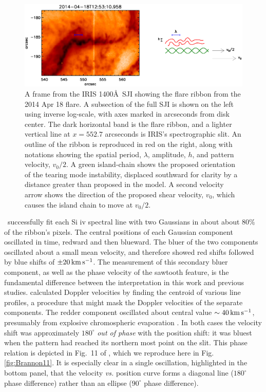 \begin{figure}[htbp]
\centerline{\includegraphics[width=6.5in]{ParkerLongcope2017/sji_context}}
\caption{A frame from the IRIS 1400\AA\ SJI showing the flare ribbon from the 2014 Apr 18 flare.  A subsection of the full SJI is shown on the left using inverse log-scale, with axes marked in arcseconds from disk center.  The dark horizontal band is the flare ribbon, and a lighter vertical line at $x=552.7$ arcseconds is IRIS's spectrographic slit.  An outline of the ribbon is reproduced  in red on the right, along with notations showing the spatial period, $\lambda$, amplitude, $h$, and pattern velocity, $v_0/2$.  A green island-chain shows the proposed orientation of the tearing mode instability, displaced southward for clarity by a distance greater than proposed in the model.  A second velocity arrow shows the direction of the proposed shear velocity, $v_0$, which causes the island chain to move at $v_0/2$.}
	\label{fig:SJI}
\end{figure}

\BLQ\ successfully fit  each Si {\sc iv} spectral line with two Gaussians in about about $80\%$ of the ribbon's pixels.  The central positions of each Gaussian component oscillated in time, redward and then blueward. The bluer of the two components oscillated about a small mean velocity, and therefore showed red shifts followed by blue shifts of 
$\pm 20\,{\rm km\, s^{-1}}$. The measurement of this secondary bluer component, as well as the phase velocity of the sawtooth feature, is the fundamental difference between the interpretation in this work and previous studies. \citet{Brosius2015} calculated Doppler velocities by finding the centroid of various line profiles, a procedure that might mask the Doppler velocities of the separate components. The redder component oscillated about central value $\sim 40\,{\rm km\, s^{-1}}$, presumably from explosive chromospheric evaporation \citep{Fisher1985b}.  In both cases the velocity shift was approximately $180^{\circ}$  {\em out of phase} with the position shift: it was bluest when the pattern had reached its northern most point on the slit.  This phase relation is depicted in Fig.\ 11 of \BLQ, which we reproduce here in Fig. \ref{fig:Brannon11}.  It is especially clear in a single oscillation, highlighted in the bottom panel, that the velocity {\em vs.} position curve forms a diagonal line ($180^{\circ}$ phase difference) rather than an ellipse ($90^{\circ}$ phase difference).

